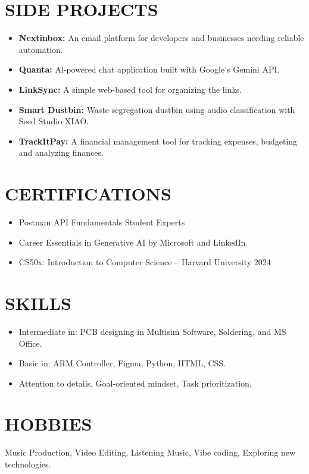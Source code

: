 \documentclass[10pt, letterpaper]{article}
\newcommand{\bodyfont}{\fontsize{10pt}{12pt}\selectfont}
\begin{document}
\section*{SIDE PROJECTS}

{\bodyfont
\begin{itemize}
    \item \textbf{Nextinbox:} An email platform for developers and businesses needing reliable automation.
    \item \textbf{Quanta:} Al-powered chat application built with Google's Gemini API.
    \item \textbf{LinkSync:} A simple web-based tool for organizing the links.
    \item \textbf{Smart Dustbin:} Waste segregation dustbin using audio classification with Seed Studio XIAO.
    \item \textbf{TrackItPay:} A financial management tool for tracking expenses, budgeting and analyzing finances.
\end{itemize}
}

\section*{CERTIFICATIONS}

{\bodyfont
\begin{itemize}
    \item Postman API Fundamentals Student Experts
    \item Career Essentials in Generative AI by Microsoft and LinkedIn.
    \item CS50x: Introduction to Computer Science – Harvard University 2024
\end{itemize}
}

\section*{SKILLS}

{\bodyfont
\begin{itemize}
    \item Intermediate in: PCB designing in Multisim Software, Soldering, and MS Office.
    \item Basic in: ARM Controller, Figma, Python, HTML, CSS.
    \item Attention to details, Goal-oriented mindset, Task prioritization.
\end{itemize}
}

\section*{HOBBIES}

{\bodyfont
\noindent Music Production, Video Editing, Listening Music, Vibe coding, Exploring new technologies.
}
\end{document}
